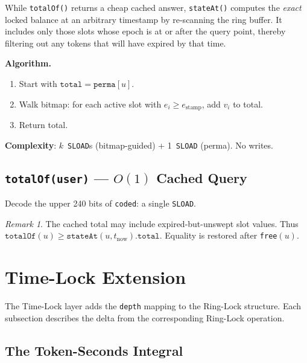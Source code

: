 \documentclass[10pt,a4paper,twocolumn]{article}
\theoremstyle{definition}
\theoremstyle{plain}
\theoremstyle{remark}
\newtheorem{remark}{Remark}[section]
\begin{document}
While \texttt{totalOf()} returns a cheap cached answer, \texttt{stateAt()} computes the \emph{exact} locked balance at an arbitrary timestamp by re-scanning the ring buffer.  It includes only those slots whose epoch is at or after the query point, thereby filtering out any tokens that will have expired by that time.

\textbf{Algorithm.}
\begin{enumerate}[leftmargin=*, nosep]
\item Start with $\texttt{total} = \texttt{perma}[u]$.
\item Walk bitmap: for each active slot with $e_i \geq e_{\text{stamp}}$, add $v_i$ to total.
\item Return total.
\end{enumerate}

\textbf{Complexity}: $k$~\texttt{SLOAD}s (bitmap-guided) + 1~\texttt{SLOAD} (perma). No writes.

\subsection{\texttt{totalOf(user)} --- $O(1)$ Cached Query}
\label{subsec:totalof}

Decode the upper 240 bits of \texttt{coded}: a single \texttt{SLOAD}.

\begin{remark}
\label{rem:totalof-inflation}
The cached total may include expired-but-unswept slot values. Thus $\texttt{totalOf}(u) \geq \texttt{stateAt}(u, t_{\text{now}}).\texttt{total}$. Equality is restored after \texttt{free}$(u)$.
\end{remark}

\FloatBarrier

\section{Time-Lock Extension}
\label{sec:timelock}

The Time-Lock layer adds the \texttt{depth} mapping to the Ring-Lock structure. Each subsection describes the delta from the corresponding Ring-Lock operation.

\subsection{The Token-Seconds Integral}
\label{subsec:integral}
\end{document}
